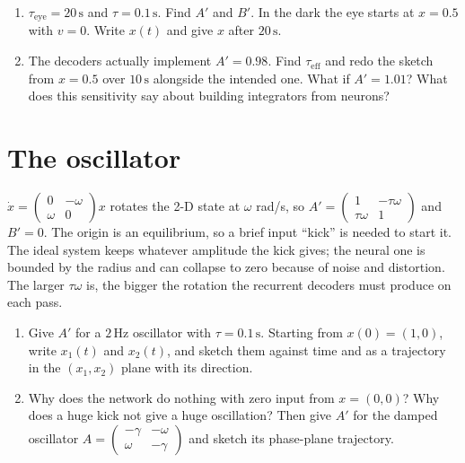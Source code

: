 \documentclass[11pt,letterpaper]{article}
\begin{document}
\begin{enumerate}
\item $\tau_{\mathrm{eye}} = 20\,\mathrm{s}$ and $\tau = 0.1\,\mathrm{s}$. Find $A'$ and $B'$. In the dark the eye starts at $x = 0.5$ with $v = 0$. Write $x(t)$ and give $x$ after $20\,\mathrm{s}$.
\item The decoders actually implement $A' = 0.98$. Find $\tau_{\mathrm{eff}}$ and redo the sketch from $x = 0.5$ over $10\,\mathrm{s}$ alongside the intended one. What if $A' = 1.01$? What does this sensitivity say about building integrators from neurons?
\end{enumerate}

\section{The oscillator}

\begin{idea}
$\dot x = \begin{pmatrix} 0 & -\omega \\ \omega & 0 \end{pmatrix}x$ rotates the 2-D state at $\omega$ rad/s, so $A' = \begin{pmatrix} 1 & -\tau\omega \\ \tau\omega & 1 \end{pmatrix}$ and $B' = 0$. The origin is an equilibrium, so a brief input ``kick'' is needed to start it. The ideal system keeps whatever amplitude the kick gives; the neural one is bounded by the radius and can collapse to zero because of noise and distortion. The larger $\tau\omega$ is, the bigger the rotation the recurrent decoders must produce on each pass.
\end{idea}

\begin{enumerate}
\item Give $A'$ for a $2\,\mathrm{Hz}$ oscillator with $\tau = 0.1\,\mathrm{s}$. Starting from $x(0) = (1, 0)$, write $x_1(t)$ and $x_2(t)$, and sketch them against time and as a trajectory in the $(x_1, x_2)$ plane with its direction.
\item Why does the network do nothing with zero input from $x = (0, 0)$? Why does a huge kick not give a huge oscillation? Then give $A'$ for the damped oscillator $A = \begin{pmatrix} -\gamma & -\omega \\ \omega & -\gamma \end{pmatrix}$ and sketch its phase-plane trajectory.
\end{enumerate}
\end{document}
